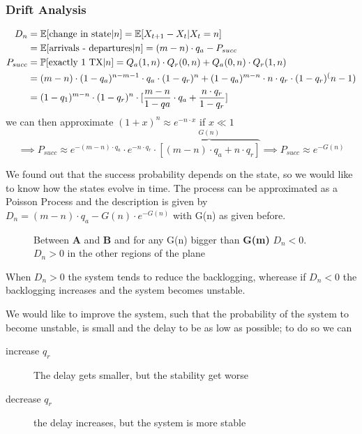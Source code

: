 \subsubsection{Drift Analysis}
\begin{equation}\begin{split}
  D_n &= \mathbb{E}[\text{change in state} | n] = \mathbb{E}[X_{t+1} - X_t | X_t = n] \\
  &= \mathbb{E}[\text{arrivals - departures} | n ] = (m-n) \cdot q_a - P_{succ} \\
  P_{succ}&= \mathbb{P}[\text{exactly 1 TX}|n] = Q_a(1,n) \cdot Q_r(0,n) + Q_a(0,n) \cdot Q_r(1,n) \\
  &= (m-n)\cdot(1-q_a)^{n-m-1} \cdot q_a \cdot(1-q_r)^n + (1-q_a)^{m-n}\cdot n \cdot q_r \cdot (1-q_r)^(n-1) \\
  &= (1-q_1)^{m-n} \cdot (1-q_r)^n \cdot [\frac{m-n}{1-qa}\cdot q_a + \frac{n \cdot q_r}{1-q_r}]
\end{split}\end{equation}
we can then approximate $(1+x)^n \approx e^{-n \cdot x}$ if $x \ll 1$
\begin{equation}
  \implies P_{succ} \approx e^{-(m-n)\cdot q_a} \cdot e^{-n\cdot q_r} \cdot \overbrace{[(m-n) \cdot q_a + n \cdot q_r]}^{G(n)}
  \implies P_{succ} \approx e^{-G(n)}
\end{equation}

We found out that the success probability depends on the state, so we would like to know how the states evolve in time.
The process can be approximated as a Poisson Process and the description is given by $D_n = (m-n)\cdot q_a - G(n) \cdot e^{-G(n)}$
with G(n) as given before.

\begin{figure}
  
  \caption{Between \textbf{A} and \textbf{B} and for any G(n) bigger than \textbf{G(m)} $D_n <0$. $D_n>0$ in the other regions of the plane}
  \label{fig:drift}
\end{figure}

When $D_n>0$ the system tends to reduce the backlogging, wherease if $D_n<0$ the backlogging
increases and the system becomes unstable.

We would like to improve the system, such that the probability of the system to become
unstable, is small and the delay to be as low as possible; to do so we can
\begin{description}
  \item[increase $q_r$] The delay gets smaller, but the stability get worse
  \item[decrease $q_r$] the delay increases, but the system is more stable
\end{description}

